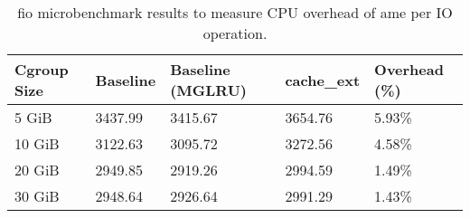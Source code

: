 \begin{table}
\centering
\caption{fio microbenchmark results to measure CPU overhead of 
ame per IO operation.}
\label{tab:eval-cpu-overhead}
\begin{tabular}{lllll}
\toprule
Cgroup Size & Baseline & Baseline (MGLRU) & cache\_ext & Overhead (\%) \\
\midrule
      5 GiB &  3437.99 &          3415.67 &   3654.76 &        5.93\% \\
     10 GiB &  3122.63 &          3095.72 &   3272.56 &        4.58\% \\
     20 GiB &  2949.85 &          2919.26 &   2994.59 &        1.49\% \\
     30 GiB &  2948.64 &          2926.64 &   2991.29 &        1.43\% \\
\bottomrule
\end{tabular}
\end{table}
